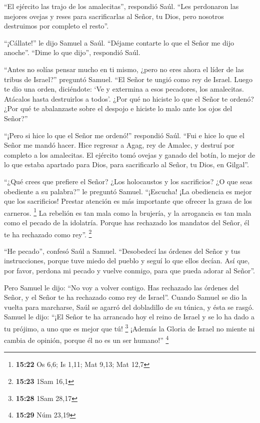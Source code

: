  ``El ejército las trajo de los amalecitas'', respondió
Saúl. ``Les perdonaron las mejores ovejas y reses para sacrificarlas al
Señor, tu Dios, pero nosotros destruimos por completo el resto''.

 ``¡Cállate!'' le dijo Samuel a Saúl. ``Déjame contarte
lo que el Señor me dijo anoche''. ``Dime lo que dijo'', respondió Saúl.

 ``Antes no solías pensar mucho en ti mismo, ¿pero no
eres ahora el líder de las tribus de Israel?'' preguntó Samuel. ``El
Señor te ungió como rey de Israel.  Luego te dio una
orden, diciéndote: `Ve y extermina a esos pecadores, los amalecitas.
Atácalos hasta destruirlos a todos'.  ¿Por qué no hiciste
lo que el Señor te ordenó? ¿Por qué te abalanzaste sobre el despojo e
hiciste lo malo ante los ojos del Señor?''

 ``¡Pero si hice lo que el Señor me ordenó!'' respondió
Saúl. ``Fui e hice lo que el Señor me mandó hacer. Hice regresar a Agag,
rey de Amalec, y destruí por completo a los amalecitas. 
El ejército tomó ovejas y ganado del botín, lo mejor de lo que estaba
apartado para Dios, para sacrificarlo al Señor, tu Dios, en Gilgal''.

 ``¿Qué crees que prefiere el Señor? ¿Los holocaustos y
los sacrificios? ¿O que seas obediente a su palabra?'' le preguntó
Samuel. ``¡Escucha! ¡La obediencia es mejor que los sacrificios! Prestar
atención es más importante que ofrecer la grasa de los carneros.
\footnote{\textbf{15:22} Os 6,6; Is 1,11; Mat 9,13; Mat 12,7}
 La rebelión es tan mala como la brujería, y la
arrogancia es tan mala como el pecado de la idolatría. Porque has
rechazado los mandatos del Señor, él te ha rechazado como rey''.
\footnote{\textbf{15:23} 1Sam 16,1}

 ``He pecado'', confesó Saúl a Samuel. ``Desobedecí las
órdenes del Señor y tus instrucciones, porque tuve miedo del pueblo y
seguí lo que ellos decían.  Así que, por favor, perdona
mi pecado y vuelve conmigo, para que pueda adorar al Señor''.

 Pero Samuel le dijo: ``No voy a volver contigo. Has
rechazado las órdenes del Señor, y el Señor te ha rechazado como rey de
Israel''.  Cuando Samuel se dio la vuelta para marcharse,
Saúl se agarró del dobladillo de su túnica, y ésta se rasgó.
 Samuel le dijo: ``¡El Señor te ha arrancado hoy el reino
de Israel y se lo ha dado a tu prójimo, a uno que es mejor que tú!
\footnote{\textbf{15:28} 1Sam 28,17}  ¡Además la Gloria
de Israel no miente ni cambia de opinión, porque él no es un ser
humano!'' \footnote{\textbf{15:29} Núm 23,19}

